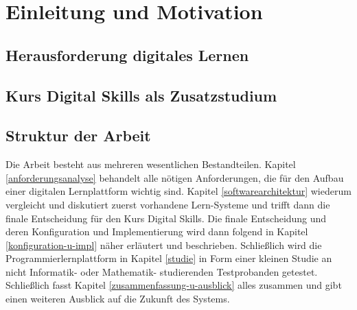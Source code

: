 \section{Einleitung und Motivation}\label{einleitung}
\subsection{Herausforderung digitales Lernen}\label{herausforderung}


\subsection{Kurs Digital Skills als Zusatzstudium}\label{kurs-digital-skills}
\subsection{Struktur der Arbeit}\label{struktur-der-arbeit}
Die Arbeit besteht aus mehreren wesentlichen Bestandteilen. Kapitel
\ref{anforderungsanalyse} behandelt alle nötigen Anforderungen, die für den
Aufbau einer digitalen Lernplattform wichtig sind. Kapitel
\ref{softwarearchitektur} wiederum vergleicht und diskutiert zuerst vorhandene
Lern-Systeme und trifft dann die finale Entscheidung für den Kurs Digital
Skills. Die finale Entscheidung und deren Konfiguration und Implementierung wird
dann folgend in Kapitel \ref{konfiguration-u-impl} näher erläutert und
beschrieben. Schließlich wird die Programmierlernplattform in Kapitel
\ref{studie} in Form einer kleinen Studie an nicht Informatik- oder Mathematik-
studierenden Testprobanden getestet. Schließlich fasst Kapitel
\ref{zusammenfassung-u-ausblick} alles zusammen und gibt einen weiteren Ausblick
auf die Zukunft des Systems.